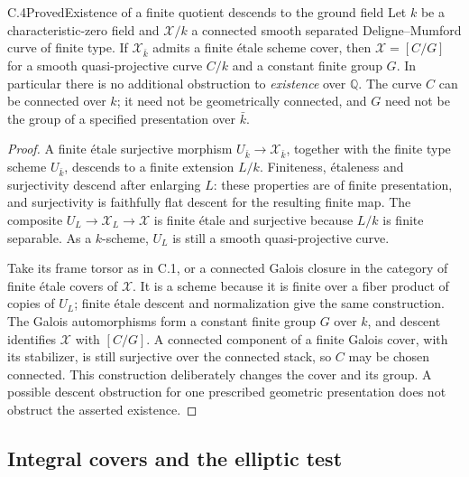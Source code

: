 \begin{statement}{C.4}{Proved}{Existence of a finite quotient descends to the ground field}
Let $k$ be a characteristic-zero field and $\mathcal X/k$ a
connected smooth separated Deligne--Mumford curve of finite type.
If $\mathcal X_{\bar k}$ admits a finite \'etale scheme cover,
then $\mathcal X=[C/G]$ for a smooth quasi-projective curve $C/k$
and a constant finite group $G$. In particular there is no
additional obstruction to \emph{existence} over $\mathbb Q$.
The curve $C$ can be connected over $k$; it need not be
geometrically connected, and $G$ need not be the group of a
specified presentation over $\bar k$.
\end{statement}
\begin{proof}
A finite \'etale surjective morphism
$U_{\bar k}\to\mathcal X_{\bar k}$, together with the finite
type scheme $U_{\bar k}$, descends to a finite extension $L/k$.
Finiteness, \'etaleness and surjectivity descend after enlarging
$L$: these properties are of finite presentation, and
surjectivity is faithfully flat descent for the resulting
finite map. The composite $U_L\to\mathcal X_L\to\mathcal X$
is finite \'etale and surjective because $L/k$ is finite
separable. As a $k$-scheme, $U_L$ is still a smooth
quasi-projective curve.

Take its frame torsor as in C.1, or a connected Galois closure
in the category of finite \'etale covers of $\mathcal X$.
It is a scheme because it is finite over a fiber product of
copies of $U_L$; finite \'etale descent and normalization give
the same construction. The Galois automorphisms form a
constant finite group $G$ over $k$, and descent identifies
$\mathcal X$ with $[C/G]$. A connected component of a finite
Galois cover, with its stabilizer, is still surjective over
the connected stack, so $C$ may be chosen connected.
This construction deliberately changes the cover and its group.
A possible descent obstruction for one prescribed geometric
presentation does not obstruct the asserted existence.
\end{proof}

\subsection{Integral covers and the elliptic test}


